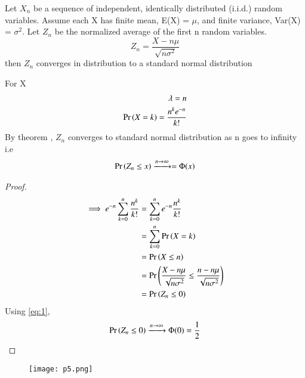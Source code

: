 \documentclass[journal,12pt,twocolumn]{IEEEtran}
\begin{document}
\begin{theorem}
Let $X_n$ be a sequence of independent, identically distributed (i.i.d.) random variables. Assume each X has finite mean, E(X) = $\mu$, and finite variance, Var(X) = $\sigma^2$. Let $Z_n$ be the normalized average of the first n random variables.
\begin{equation}
     Z_n = \frac{X - n \mu}{\sqrt{n \sigma^2}}
\end{equation}
 then $Z_n$ converges in distribution to a standard normal distribution
\end{theorem}
For X 
\begin{align}
    \lambda = n \\
    \Pr\left(X = k\right) = \frac{n^k e^{-n}}{k!}
\end{align}
By theorem , $Z_n$ converges to standard normal distribution as n goes to infinity i.e
\begin{align}
    \Pr\left(Z_n \leq x\right) \xrightarrow{ n \rightarrow \infty} = \Phi(x) \label{eq:1}
\end{align}
\begin{proof}
\begin{align}
\implies e^{-n} \sum_{k=0}^{n} \frac{n^k}{k!} & = \sum_{k = 0}^{n} e^{-n}  \frac{n^k}{k!} \\
& = \sum_{k = 0}^{n} \Pr\left(X=k\right) \\
& = \Pr\left(X \leq n\right) \\
& = \Pr\left( \frac{X - n \mu}{\sqrt{n \sigma^2}} \leq \frac{n - n \mu}{\sqrt{n \sigma^2}}\right) \\
& = \Pr\left(Z_n \leq 0\right)
\end{align}
Using \eqref{eq:1},
\begin{align}
\Pr\left( Z_n \leq 0\right) \xrightarrow{n \rightarrow \infty} \Phi(0)
 = \frac{1}{2}
\end{align}
\end{proof}

\begin{figure}
    \texttt{[image: p5.png]}
    \label{fig:1}
\end{figure}
\end{document}
